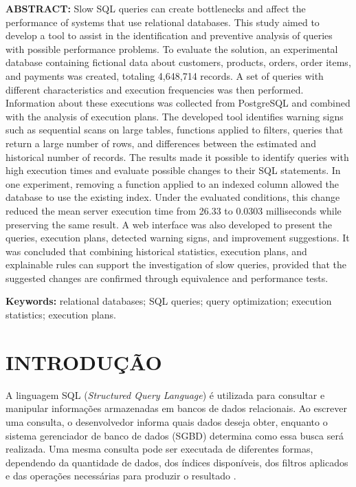 \documentclass{UNESC}
\begin{document}
\vspace{1.0em}
\noindent
\textbf{ABSTRACT:} Slow SQL queries can create bottlenecks and affect the performance of systems that use relational databases. This study aimed to develop a tool to assist in the identification and preventive analysis of queries with possible performance problems. To evaluate the solution, an experimental database containing fictional data about customers, products, orders, order items, and payments was created, totaling 4,648,714 records. A set of queries with different characteristics and execution frequencies was then performed. Information about these executions was collected from PostgreSQL and combined with the analysis of execution plans. The developed tool identifies warning signs such as sequential scans on large tables, functions applied to filters, queries that return a large number of rows, and differences between the estimated and historical number of records. The results made it possible to identify queries with high execution times and evaluate possible changes to their SQL statements. In one experiment, removing a function applied to an indexed column allowed the database to use the existing index. Under the evaluated conditions, this change reduced the mean server execution time from 26.33 to 0.0303 milliseconds while preserving the same result. A web interface was also developed to present the queries, execution plans, detected warning signs, and improvement suggestions. It was concluded that combining historical statistics, execution plans, and explainable rules can support the investigation of slow queries, provided that the suggested changes are confirmed through equivalence and performance tests.

\vspace{0.5em}
\noindent
\textbf{Keywords:} relational databases; SQL queries; query optimization; execution statistics; execution plans.

\section{INTRODUÇÃO}

A linguagem SQL (\textit{Structured Query Language}) é utilizada para consultar e manipular informações armazenadas em bancos de dados relacionais. Ao escrever uma consulta, o desenvolvedor informa quais dados deseja obter, enquanto o sistema gerenciador de banco de dados (SGBD) determina como essa busca será realizada. Uma mesma consulta pode ser executada de diferentes formas, dependendo da quantidade de dados, dos índices disponíveis, dos filtros aplicados e das operações necessárias para produzir o resultado \cite{lan2021optimizer}.
\end{document}
